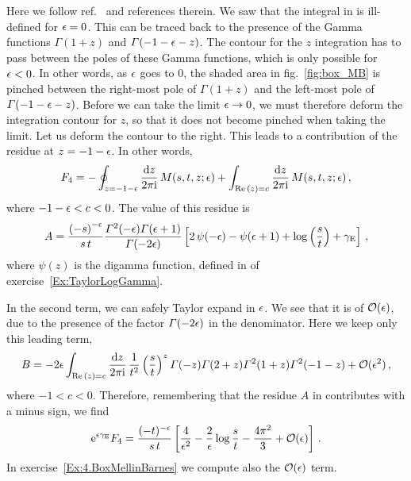 Here we follow ref.~\cite{ch4Czakon:2005rk} and references therein.
We saw that the integral in  is ill-defined for $\epsilon = 0$.
This can be traced back to the presence of the Gamma functions
$\Gamma(1+z)$ and $\Gamma(-1-\eps-z)$. The contour for the $z$ integration has to pass between the poles of these Gamma functions, which is only possible for $\epsilon<0$. In other words, as $\epsilon$ goes to $0$, the shaded area in fig.~\ref{fig:box_MB} is pinched between the right-most pole of $\Gamma(1+z)$ and the left-most pole of $\Gamma(-1-\eps-z)$. Before we can take the limit $\epsilon \to 0$, we must therefore deform the integration contour for $z$, so that it does not become pinched when taking the limit.
Let us deform the contour to the right.
This leads to a contribution of the residue at $z=-1-\epsilon$. In other words, 
\begin{align}
F_{4} = - \oint_{z=-1-\epsilon}  \frac{\mathrm{d} z}{2 \pi \mathrm{i}} \,  M(s,t,z;\epsilon) +  \int_{  \text{Re}\,(z) = c }  \frac{\mathrm{d} z}{2 \pi \mathrm{i}} \, M(s,t,z;\epsilon) \,,
\end{align}
where $-1-\epsilon < c < 0$.
The value of this residue is
%
\begin{align} \label{eq:MBboxA}
A = \frac{ \left(-s\right)^{-{\eps}} }{s \, t} 
\frac{ \Gamma^2(-{\eps}) \Gamma ({\eps}+1) }{ \Gamma (-2
   {\eps})}
  \left[ 2 \, \psi(-{\eps})-\psi({\eps}+1)+\log\left(\frac{s}{t}\right)+\gamma_{\rm E} \right]\,,
\end{align}
where $\psi(z)$ is the digamma function, defined in  of exercise~\ref{Ex:TaylorLogGamma}.

In the second term, we can safely Taylor expand in $\epsilon$.
We see that it is of $\mathcal{O}(\epsilon)$, due to the presence of the factor $\Gamma(-2\eps)$ in the denominator. 
Here we keep only this leading term,
\begin{align} \label{eq:MBboxB}
B = -2 \eps \int_{  \Re(z) = c}  \frac{\d z}{2 \pi \i} \, \frac{1}{t^2} \left(\frac{s}{t}\right)^z  \Gamma(-z) \Gamma(2+z) {\Gamma^2(1+z) \Gamma^2(-1-z)}
  + \cO(\eps^2) \,,
\end{align}
where $-1<c<0$.
Therefore, remembering that the residue $A$ in  contributes with a minus sign, we find
\begin{align}\label{eq:answerboxchapter4}
\mathrm{e}^{\epsilon \gamma_{\rm E}} F_{4} =  \frac{(-t)^{-\epsilon}}{s\,t} \left[  \frac{4}{\epsilon^2}  - \frac{2}{\epsilon}  \log \frac{s}{t} -  \frac{4 \pi^2}{3} + \mathcal{O}(\epsilon)   \right] \,.
\end{align}
In exercise~\ref{Ex:4.BoxMellinBarnes} we compute also the $\mathcal{O}(\epsilon)$ term.

